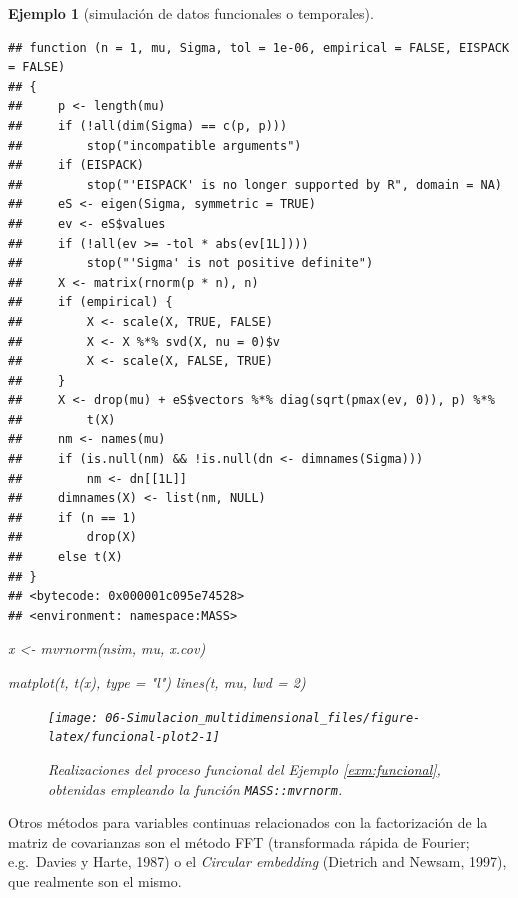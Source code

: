\documentclass[
]{book}
\newenvironment{Shaded}{\begin{snugshade}}{\end{snugshade}}
\newcommand{\AttributeTok}[1]{\textcolor[rgb]{0.77,0.63,0.00}{#1}}
\newcommand{\DecValTok}[1]{\textcolor[rgb]{0.00,0.00,0.81}{#1}}
\newcommand{\FunctionTok}[1]{\textcolor[rgb]{0.00,0.00,0.00}{#1}}
\newcommand{\NormalTok}[1]{#1}
\newcommand{\OtherTok}[1]{\textcolor[rgb]{0.56,0.35,0.01}{#1}}
\newcommand{\StringTok}[1]{\textcolor[rgb]{0.31,0.60,0.02}{#1}}
\theoremstyle{break}
\newtheorem{example}{Ejemplo}[chapter]
\theoremstyle{nonumberplain}
\begin{document}
\begin{example}[simulación de datos funcionales o temporales]
\begin{verbatim}
## function (n = 1, mu, Sigma, tol = 1e-06, empirical = FALSE, EISPACK = FALSE) 
## {
##     p <- length(mu)
##     if (!all(dim(Sigma) == c(p, p))) 
##         stop("incompatible arguments")
##     if (EISPACK) 
##         stop("'EISPACK' is no longer supported by R", domain = NA)
##     eS <- eigen(Sigma, symmetric = TRUE)
##     ev <- eS$values
##     if (!all(ev >= -tol * abs(ev[1L]))) 
##         stop("'Sigma' is not positive definite")
##     X <- matrix(rnorm(p * n), n)
##     if (empirical) {
##         X <- scale(X, TRUE, FALSE)
##         X <- X %*% svd(X, nu = 0)$v
##         X <- scale(X, FALSE, TRUE)
##     }
##     X <- drop(mu) + eS$vectors %*% diag(sqrt(pmax(ev, 0)), p) %*% 
##         t(X)
##     nm <- names(mu)
##     if (is.null(nm) && !is.null(dn <- dimnames(Sigma))) 
##         nm <- dn[[1L]]
##     dimnames(X) <- list(nm, NULL)
##     if (n == 1) 
##         drop(X)
##     else t(X)
## }
## <bytecode: 0x000001c095e74528>
## <environment: namespace:MASS>
\end{verbatim}

\begin{Shaded}
\begin{Highlighting}[]
\NormalTok{x }\OtherTok{\textless{}{-}} \FunctionTok{mvrnorm}\NormalTok{(nsim, mu, x.cov)}

\FunctionTok{matplot}\NormalTok{(t, }\FunctionTok{t}\NormalTok{(x), }\AttributeTok{type =} \StringTok{"l"}\NormalTok{)}
\FunctionTok{lines}\NormalTok{(t, mu, }\AttributeTok{lwd =} \DecValTok{2}\NormalTok{)}
\end{Highlighting}
\end{Shaded}

\begin{figure}[!htb]

{\centering \texttt{[image: 06-Simulacion\_multidimensional\_files/figure-latex/funcional-plot2-1]} 

}

\caption{Realizaciones del proceso funcional del Ejemplo \ref{exm:funcional}, obtenidas empleando la función \texttt{MASS::mvrnorm}.}\label{fig:funcional-plot2}
\end{figure}

\end{example}

Otros métodos para variables continuas relacionados con la factorización de la matriz de covarianzas son el método FFT (transformada rápida de Fourier; e.g.~Davies y Harte, 1987) o el \emph{Circular embedding} (Dietrich and Newsam, 1997), que realmente son el mismo.
\end{document}
